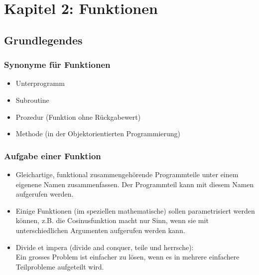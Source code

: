 
\section{Kapitel 2: Funktionen\hfill}
\label{sec:Kapitel 2: Funktionen}


\subsection{Grundlegendes\hfill}
\label{sec:Grundlegendes}

\subsubsection{Synonyme für Funktionen\hfill}
\label{sec:Synonyme fuer Funktionen}
\begin{itemize}
	\item Unterprogramm
	\item Subroutine
	\item Prozedur (Funktion ohne Rückgabewert)
	\item Methode (in der Objektorientierten Programmierung)
\end{itemize}

\subsubsection{Aufgabe einer Funktion\hfill}
\label{sec:Aufgabe einer Funktion}
\begin{itemize}
	\item Gleichartige, funktional zusammengehörende Programmteile unter einem eigenene Namen zusammenfassen. Der Programmteil kann mit diesem Namen aufgerufen werden.
	\item Einige Funktionen (im speziellen mathematische) sollen parametrisiert werden können, z.B. die Cosinusfunktion macht nur Sinn, wenn sie mit unterschiedlichen Argumenten aufgerufen werden kann.
	\item Divide et impera (divide and conquer, teile und herrsche):
	\\ Ein grosses Problem ist einfacher zu lösen, wenn es in mehrere einfachere Teilprobleme aufgeteilt wird.
\end{itemize}

